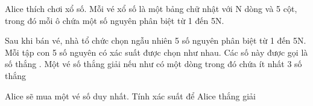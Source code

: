 Alice thích chơi xổ số. Mỗi vé xổ số là một bảng chữ nhật với N dòng và 5 cột, trong đó mỗi ô chứa một số nguyên phân biệt từ 1 đến 5N.  

   Sau khi bán vé, nhà tổ chức chọn ngẫu nhiên 5 số nguyên phân biệt từ 1 đến 5N. Mỗi tập con 5 số nguyên có xác suất được chọn như nhau. Các số này được gọi là   số thắng   . Một vé số thắng giải nếu như có một dòng trong đó chứa ít nhất 3   số thắng

   Alice sẽ mua một vé số duy nhất. Tính xác suất để Alice thắng giải